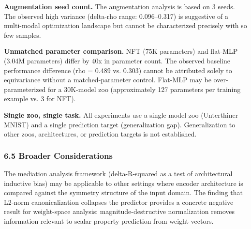 \textbf{Augmentation seed count.} The augmentation analysis is based on 3 seeds. The observed high variance (delta-rho range: 0.096--0.317) is suggestive of a multi-modal optimization landscape but cannot be characterized precisely with so few samples.

\textbf{Unmatched parameter comparison.} NFT (75K parameters) and flat-MLP (3.04M parameters) differ by 40x in parameter count. The observed baseline performance difference (rho = 0.489 vs. 0.303) cannot be attributed solely to equivariance without a matched-parameter control. Flat-MLP may be over-parameterized for a 30K-model zoo (approximately 127 parameters per training example vs. 3 for NFT).

\textbf{Single zoo, single task.} All experiments use a single model zoo (Unterthiner MNIST) and a single prediction target (generalization gap). Generalization to other zoos, architectures, or prediction targets is not established.

\subsubsection{6.5 Broader Considerations}

The mediation analysis framework (delta-R-squared as a test of architectural inductive bias) may be applicable to other settings where encoder architecture is compared against the symmetry structure of the input domain. The finding that L2-norm canonicalization collapses the predictor provides a concrete negative result for weight-space analysis: magnitude-destructive normalization removes information relevant to scalar property prediction from weight vectors.
